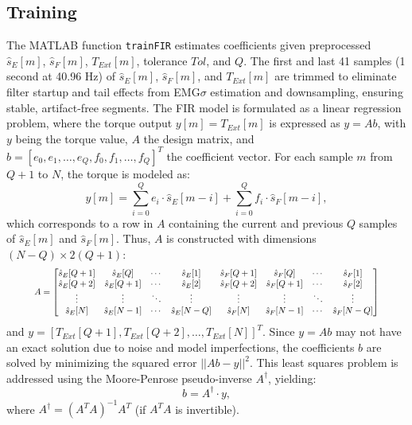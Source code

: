 \documentclass[12pt]{article}
\begin{document}
\subsection*{Training}
The MATLAB function \texttt{trainFIR} estimates coefficients given preprocessed $\hat{s}_E[m]$, $\hat{s}_F[m]$, $T_{Ext}[m]$, tolerance $Tol$, and $Q$. The first and last 41 samples (1 second at 40.96 Hz) of $\hat{s}_E[m]$, $\hat{s}_F[m]$, and $T_{Ext}[m]$ are trimmed to eliminate filter startup and tail effects from EMG$\sigma$ estimation and downsampling, ensuring stable, artifact-free segments. The FIR model is formulated as a linear regression problem, where the torque output $y[m] = T_{Ext}[m]$ is expressed as $y = A b$, with $y$ being the torque value, $A$ the design matrix, and $b = [e_0, e_1, \ldots, e_Q, f_0, f_1, \ldots, f_Q]^T$ the coefficient vector. For each sample $m$ from $Q+1$ to $N$, the torque is modeled as:
\begin{equation}
y[m] = \sum_{i=0}^{Q} e_i \cdot \hat{s}_E[m-i] + \sum_{i=0}^{Q} f_i \cdot \hat{s}_F[m-i],
\end{equation}
which corresponds to a row in $A$ containing the current and previous $Q$ samples of $\hat{s}_E[m]$ and $\hat{s}_F[m]$. Thus, $A$ is constructed with dimensions $(N-Q) \times 2(Q+1)$:
\begin{equation}
\resizebox{0.9\textwidth}{!}{$ A = \begin{bmatrix} \hat{s}_E[Q+1] & \hat{s}_E[Q] & \cdots & \hat{s}_E[1] & \hat{s}_F[Q+1] & \hat{s}_F[Q] & \cdots & \hat{s}_F[1] \\ \hat{s}_E[Q+2] & \hat{s}_E[Q+1] & \cdots & \hat{s}_E[2] & \hat{s}_F[Q+2] & \hat{s}_F[Q+1] & \cdots & \hat{s}_F[2] \\ \vdots & \vdots & \ddots & \vdots & \vdots & \vdots & \ddots & \vdots \\ \hat{s}_E[N] & \hat{s}_E[N-1] & \cdots & \hat{s}_E[N-Q] & \hat{s}_F[N] & \hat{s}_F[N-1] & \cdots & \hat{s}_F[N-Q] \end{bmatrix} $}
\end{equation}
and $y = [T_{Ext}[Q+1], T_{Ext}[Q+2], \ldots, T_{Ext}[N]]^T$. Since $y = A b$ may not have an exact solution due to noise and model imperfections, the coefficients $b$ are solved by minimizing the squared error $||A b - y||^2$. This least squares problem is addressed using the Moore-Penrose pseudo-inverse $A^\dagger$, yielding:
\begin{equation}
b = A^\dagger \cdot y,
\end{equation}
where $A^\dagger = (A^T A)^{-1} A^T$ (if $A^T A$ is invertible).
\end{document}
